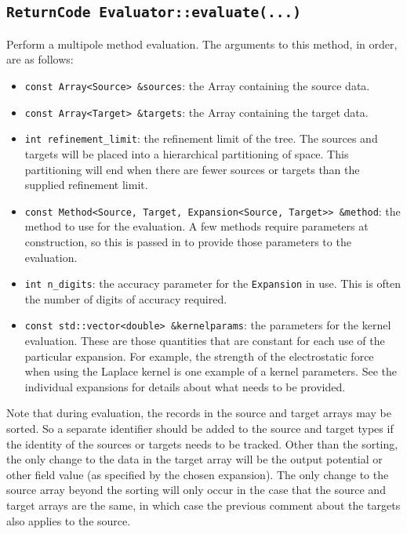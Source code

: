 \documentclass[11pt]{book}
\begin{document}
\subsection{{\tt ReturnCode Evaluator::evaluate(...)}}

Perform a multipole method evaluation. The arguments to this method, in order,
are as follows:

\begin{itemize}
\item {\tt const Array<Source> \&sources}: the Array containing the source data.
\item {\tt const Array<Target> \&targets}: the Array containing the target data.
\item {\tt int refinement\_limit}: the refinement limit of the tree. The sources
  and  targets will be placed into a hierarchical partitioning of space. This
 partitioning will end when there are fewer sources or targets than the supplied
 refinement limit.
\item {\tt const Method<Source, Target, Expansion<Source, Target>> \&method}:
  the  method to use for the evaluation. A few methods require parameters at
 construction, so this is passed in to provide those parameters to the
 evaluation.
\item {\tt int n\_digits}: the accuracy parameter for the {\tt Expansion} in
  use. This is  often the number of digits of accuracy required.
\item {\tt const std::vector<double> \&kernelparams}: the parameters for the
  kernel evaluation. These are those quantities that are constant for each use
  of the particular expansion. For example, the strength of the electrostatic
  force when using the Laplace kernel is one example of a kernel parameters. See
  the individual expansions for details about what needs to be provided.
\end{itemize} 

Note that during evaluation, the records in the source and target arrays may be
sorted. So a separate identifier should be added to the source and target types
if the identity of the sources or targets needs to be tracked. Other than the
sorting, the only change to the data in the target array will be the output
potential or other field value (as specified by the chosen expansion). The
only change to the source array beyond the sorting will only occur in the case
that the source and target arrays are the same, in which case the previous
comment about the targets also applies to the source.
\end{document}
